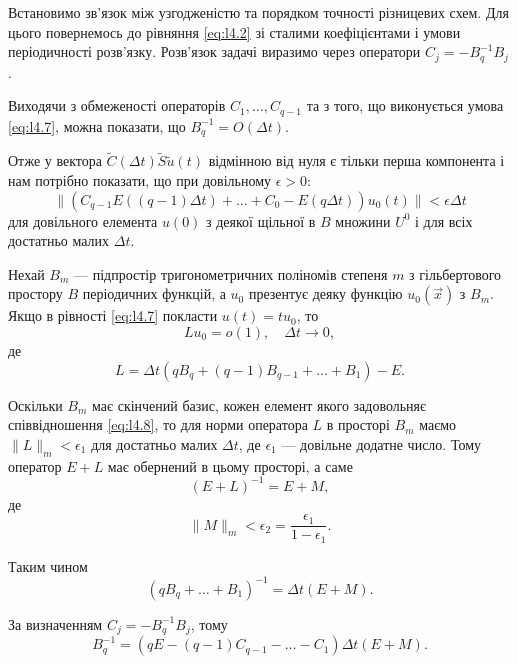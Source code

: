 Встановимо зв'язок між узгодженістю та порядком точності різницевих схем. Для цього повернемось до рівняння \eqref{eq:l4.2} зі сталими коефіцієнтами і умови періодичності розв'язку. Розв'язок задачі виразимо через оператори $C_j = -B_q^{-1} B_j$. \medskip

Виходячи з обмеженості операторів $C_1, \ldots, C_{q - 1}$ та з того, що виконується умова \eqref{eq:l4.7}, можна показати, що $B_q^{-1} = O(\Delta t)$. \medskip

Отже у вектора $\tilde C(\Delta t) \tilde S \tilde u(t)$ відмінною від нуля є тільки перша компонента і нам потрібно показати, що при довільному $\epsilon > 0$:
\begin{equation}
    \| (C_{q - 1} E ( (q - 1) \Delta t) + \ldots + C_0 - E (q \Delta t) ) u_0(t) \| < \epsilon \Delta t
\end{equation}
для довільного елемента $u(0)$ з деякої щільної в $B$ множини $U^0$ і для всіх достатньо малих $\Delta t$. \medskip

Нехай $B_m$ --- підпростір тригонометричних поліномів степеня $m$ з гільбертового простору $B$ періодичних функцій, а $u_0$ презентує деяку функцію $u_0(\vec x)$ з $B_m$. Якщо в рівності \eqref{eq:l4.7} покласти $u(t) = t u_0$, то 
\begin{equation}
    \label{eq:l4.8}
    L u_0 = o(1), \quad \Delta t \to 0,
\end{equation}
де
\begin{equation}
    \label{eq:l4.9}
    L = \Delta t ( q B_q + (q - 1) B_{q - 1} + \ldots + B_1 ) - E.
\end{equation}

Оскільки $B_m$ має скінчений базис, кожен елемент якого задовольняє співвідношення \eqref{eq:l4.8}, то для норми оператора $L$ в просторі $B_m$ маємо $\|L\|_m < \epsilon_1$ для достатньо малих $\Delta t$, де $\epsilon_1$ --- довільне додатне число. Тому оператор $E + L$ має обернений в цьому просторі, а саме
\begin{equation*}
    (E + L)^{-1} = E + M,
\end{equation*}
де
\begin{equation*}
    \|M\|_m < \epsilon_2 = \frac{\epsilon_1}{1 - \epsilon_1}.    
\end{equation*}

Таким чином
\begin{equation*}
    (q B_q + \ldots + B_1)^{-1} = \Delta t (E + M).
\end{equation*}

За визначенням $C_j = -B_q^{-1} B_j$, тому
\begin{equation}
    \label{eq:l4.10}
    B_q^{-1} = (q E - (q - 1) C_{q - 1} - \ldots - C_1) \Delta t (E + M).
\end{equation}

